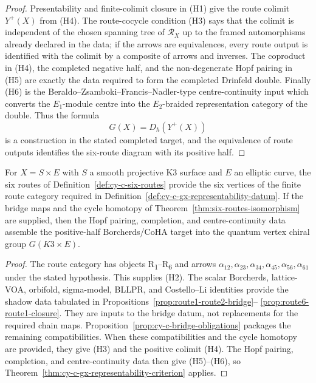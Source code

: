 \begin{proof}
Presentability and finite-colimit closure in (H1) give the route colimit
$Y^+(X)$ from (H4). The route-cocycle condition (H3) says that the
colimit is independent of the chosen spanning tree of $\mathcal{R}_X$ up
to the framed automorphisms already declared in the data; if the arrows
are equivalences, every route output is identified with the colimit by a
composite of arrows and inverses. The coproduct in (H4), the completed
negative half, and the non-degenerate Hopf pairing in (H5) are exactly
the data required to form the completed Drinfeld double. Finally (H6)
is the Beraldo--Zsamboki--Francis--Nadler-type centre-continuity input
which converts the $E_1$-module centre into the $E_2$-braided
representation category of the double. Thus the formula
\[
 G(X)=D_\hbar(Y^+(X))
\]
is a construction in the stated completed target, and the equivalence of
route outputs identifies the six-route diagram with its positive half.
\end{proof}

\begin{corollary}
\label{cor:cy-c-k3e-stratified-worked-locus}
For $X=S\times E$ with $S$ a smooth projective K3 surface and $E$ an
elliptic curve, the six routes of Definition~\ref{def:cy-c-six-routes}
provide the six vertices of the finite route category required in
Definition~\ref{def:cy-c-gx-representability-datum}. If the bridge
maps and the cycle homotopy of
Theorem~\ref{thm:six-routes-isomorphism} are supplied, then the Hopf
pairing, completion, and centre-continuity data assemble the
positive-half Borcherds/CoHA target into the quantum
vertex chiral group
$G(K3\times E)$.
\end{corollary}

\begin{proof}
The route category has objects R\textsubscript{1}--R\textsubscript{6}
and arrows $\alpha_{12},\alpha_{23},\alpha_{34},\alpha_{45},
\alpha_{56},\alpha_{61}$ under the stated hypothesis. This supplies
\textup{(H2)}. The scalar Borcherds, lattice-VOA,
orbifold, sigma-model, BLLPR, and Costello--Li identities provide the
shadow data tabulated in
Propositions~\ref{prop:route1-route2-bridge}--
\ref{prop:route6-route1-closure}. They are inputs to the
bridge datum, not replacements for the required chain maps.
Proposition~\ref{prop:cy-c-bridge-obligations} packages the remaining
compatibilities. When these compatibilities and the cycle homotopy are
provided, they give \textup{(H3)} and the positive colimit
\textup{(H4)}. The Hopf pairing, completion, and centre-continuity data
then give \textup{(H5)}--\textup{(H6)}, so
Theorem~\ref{thm:cy-c-gx-representability-criterion} applies.
\end{proof}

